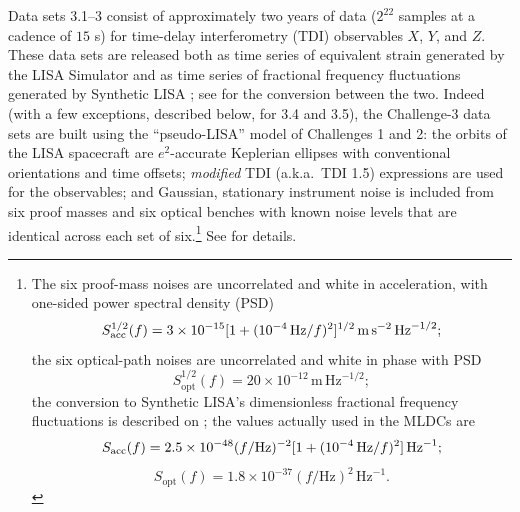 \documentclass{iopart}
\begin{document}
Data sets 3.1--3 consist of approximately two years of data ($2^{22}$ samples at a cadence of $15$ s) for time-delay interferometry (TDI) observables $X$, $Y$, and $Z$. These data sets are released both as time series of equivalent strain generated by the LISA Simulator \cite{lisasimulator} and as time series of fractional frequency fluctuations generated by Synthetic LISA \cite{synthlisa}; see \cite[p.\ S556]{mldcgwdaw2} for the conversion between the two. Indeed (with a few exceptions, described below, for 3.4 and 3.5), the Challenge-3 data sets are built using the ``pseudo-LISA'' model of Challenges 1 and 2: the orbits of the LISA spacecraft are $e^2$-accurate Keplerian ellipses with conventional orientations and time offsets; \emph{modified} TDI (a.k.a.\ TDI 1.5) expressions are used for the observables; and Gaussian, stationary instrument noise is included from six proof masses and six optical benches with known noise levels that are identical across each set of six.\footnote{The six proof-mass noises are uncorrelated and white in acceleration, with one-sided power spectral density (PSD)
%
\begin{displaymath}
S_\mathrm{acc}^{1/2}(f) = 3 \times 10^{-15} [1 + (10^{-4}\,{\rm Hz}/f)^2]^{1/2} \, \mathrm{m}\, \mathrm{s}^{-2}\, \mathrm{Hz}^{-1/2};
\end{displaymath}
%
the six optical-path noises are uncorrelated and white in phase with PSD
%
\begin{displaymath}
S_\mathrm{opt}^{1/2}(f) = 20 \times 10^{-12} \, \mathrm{m}\, \mathrm{Hz}^{-1/2};
\end{displaymath}
%
the conversion to Synthetic LISA's dimensionless fractional frequency fluctuations is described on \cite[p.\ 6]{synthlisa}; the values actually used in the MLDCs are
%
\begin{displaymath}
S_\mathrm{acc}(f) = 2.5 \times 10^{-48} (f/\mathrm{Hz})^{-2} [1 + (10^{-4}\,{\rm Hz}/f)^2] \, \mathrm{Hz}^{-1};
\end{displaymath}
\begin{displaymath}
S_\mathrm{opt}(f) = 1.8 \times 10^{-37} (f/\mathrm{Hz})^{2} \, \mathrm{Hz}^{-1}.
\end{displaymath}
} See \cite{mldcgwdaw2} for details.
\end{document}
